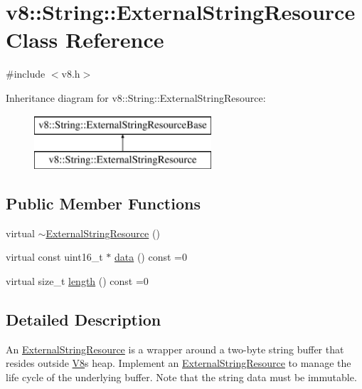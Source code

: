 \hypertarget{classv8_1_1_string_1_1_external_string_resource}{}\section{v8\+:\+:String\+:\+:External\+String\+Resource Class Reference}
\label{classv8_1_1_string_1_1_external_string_resource}


{\ttfamily \#include $<$v8.\+h$>$}

Inheritance diagram for v8\+:\+:String\+:\+:External\+String\+Resource\+:\begin{figure}[H]
\begin{center}
\leavevmode
\includegraphics[height=2.000000cm]{classv8_1_1_string_1_1_external_string_resource}
\end{center}
\end{figure}
\subsection*{Public Member Functions}
\begin{DoxyCompactItemize}
\item 
virtual \hyperlink{classv8_1_1_string_1_1_external_string_resource_a6b7ef9e33a47059092e1447b10c35416}{$\sim$\+External\+String\+Resource} ()
\item 
virtual const uint16\+\_\+t $\ast$ \hyperlink{classv8_1_1_string_1_1_external_string_resource_a987309199b848511adb708e221e0fb0a}{data} () const =0
\item 
virtual size\+\_\+t \hyperlink{classv8_1_1_string_1_1_external_string_resource_ab5ca300fea077d7c7774ec49d32e4da1}{length} () const =0
\end{DoxyCompactItemize}


\subsection{Detailed Description}
An \hyperlink{classv8_1_1_string_1_1_external_string_resource}{External\+String\+Resource} is a wrapper around a two-\/byte string buffer that resides outside \hyperlink{classv8_1_1_v8}{V8}\textquotesingle{}s heap. Implement an \hyperlink{classv8_1_1_string_1_1_external_string_resource}{External\+String\+Resource} to manage the life cycle of the underlying buffer. Note that the string data must be immutable. 

